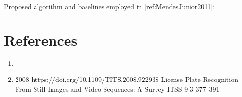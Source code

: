 Proposed algorithm and baselines employed in \ref{ref:MendesJunior2011}: 

\section*{References}

\begin{enumerate}
\item{}
\item{}
  {
  }
  {2008}
  {https://doi.org/10.1109/TITS.2008.922938}
  {License Plate Recognition From Still Images and Video Sequences: A Survey}
  {ITSS}
  {9}
  {3}
  {377--391}
  {}
\end{enumerate}




